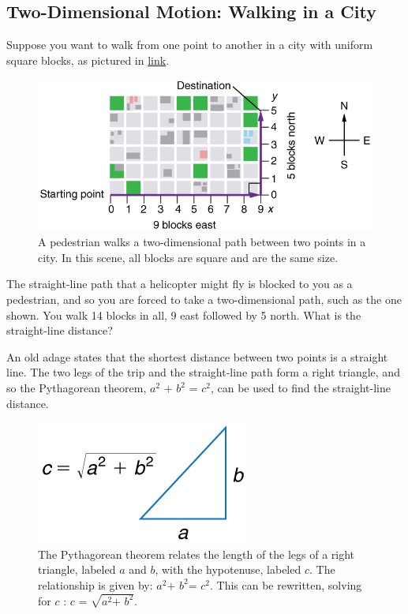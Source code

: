 \documentclass[
]{book}
\begin{document}
\hypertarget{fs-id1165298595412}{}
\hypertarget{two-dimensional-motion-walking-in-a-city}{%
\subsection{Two-Dimensional Motion: Walking in a City}\label{two-dimensional-motion-walking-in-a-city}}

Suppose you want to walk from one point to another in a city with
uniform square blocks, as pictured in
\protect\hyperlink{import-auto-id1165296250183}{link}.

\begin{figure}
\hypertarget{import-auto-id1165296250183}{%
\centering
\includegraphics{images/Figure_03_01_01.jpg}
\caption{A pedestrian walks a two-dimensional path between two points in a
city. In this scene, all blocks are square and are the same
size.}\label{import-auto-id1165296250183}
}
\end{figure}

The straight-line path that a helicopter might fly is blocked to you as
a pedestrian, and so you are forced to take a two-dimensional path, such
as the one shown. You walk 14 blocks in all, 9 east followed by 5 north.
What is the straight-line distance?

An old adage states that the shortest distance between two points is a
straight line. The two legs of the trip and the straight-line path form
a right triangle, and so the Pythagorean theorem,
\({a^{2}\text{~+~}b^{2}\text{~=~}c^{2}}{}\), can be used to find the
straight-line distance.

\begin{figure}
\hypertarget{import-auto-id1165298608693}{%
\centering
\includegraphics{images/Figure_03_01_02.jpg}
\caption{The Pythagorean theorem relates the length of the legs of a right
triangle, labeled \(a{}\) and \(b{}\), with the hypotenuse, labeled \(c{}\).
The relationship is given by: \({a^{2}\text{+~}b^{2}\text{=~}c^{2}}{}\).
This can be rewritten, solving for \(c{}\) :
\({c\text{~=~}\sqrt{a^{2}\text{+~}b^{2}}}{}\).}\label{import-auto-id1165298608693}
}
\end{figure}
\end{document}
